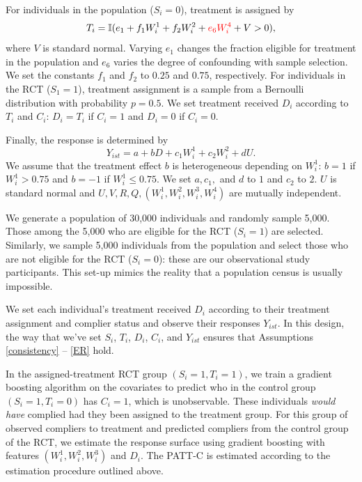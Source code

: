 \documentclass[hidelinks,12pt]{article}
\newcommand{\ind}{\mathbb{I}} %
\begin{document}
{For individuals in the population ($S_i=0$), treatment is assigned by
 \vskip 0.2in
  $$T_i = \ind(e_1 + f_1W^{1}_i + f_2W^{2}_i + {\color{red}e_6W^{4}_i} + V > 0),$$
  \vskip 0.2in
where $V$ is standard normal. Varying $e_1$ changes the fraction eligible for treatment in the population and {\color{red}$e_6$ varies the degree of confounding with sample selection.} We set the constants $f_1$ and $f_2$ to $0.25$ and $0.75$, respectively. For individuals in the RCT ($S_1=1$), treatment assignment is a sample from a Bernoulli distribution with probability $p=0.5$.
We set treatment received $D_i$ according to $T_i$ and $C_i$: $D_i = T_i$ if $C_i=1$ and $D_i = 0$ if $C_i=0$.

Finally, the response is determined by 
\vskip 0.2in
$$Y_{ist} = a + bD + c_1W^{1}_i + c_2W^{2}_i + dU.$$
\vskip 0.2in
We assume that the treatment effect $b$ is heterogeneous depending on $W^{1}_i$: $b = 1$ if $W^{1}_i > 0.75$ and $b=-1$ if $W^{1}_i \leq 0.75$.  We set $a, c_1,$ and $d$ to $1$ and $c_2$ to $2$. $U$ is standard normal and $U, V, R, Q, (W^{1}_i, W^{2}_i, W^{3}_i, W^{4}_i)$ are mutually independent.
 
We generate a population of 30,000 individuals and randomly sample 5,000. Those among the 5,000 who are eligible for the RCT ($S_i=1$) are selected. Similarly, we sample 5,000 individuals from the population and select those who are not eligible for the RCT ($S_i=0$): these are our observational study participants. This set-up mimics the reality that a population census is usually impossible.

We set each individual's treatment received $D_i$ according to their treatment assignment and complier status and observe their responses $Y_{ist}$. In this design, the way that we've set $S_i$, $T_i$, $D_i$, $C_i$, and $Y_{ist}$ ensures that Assumptions \ref{consistency} -- \ref{ER} hold.

{\color{red}
In the assigned-treatment RCT group $(S_i = 1, T_i = 1)$, we train a gradient boosting algorithm on the covariates to predict who in the control group $(S_i = 1, T_i = 0)$ has $C_i=1$, which is unobservable.} These individuals \textit{would have} complied had they been assigned to the treatment group. For this group of observed compliers to treatment and predicted compliers from the control group of the RCT, we estimate the response surface {\color{red}using gradient boosting} with features $(W^{1}_i, W^{2}_i, W^{3}_i)$ and $D_i$. The PATT-C is estimated according to the estimation procedure outlined above.

}
\end{document}
